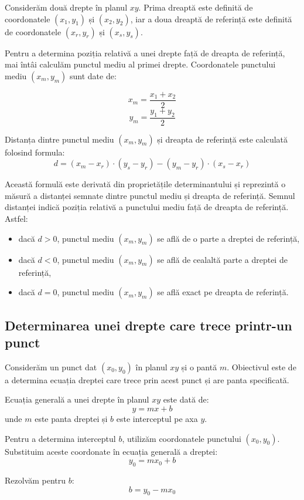 Considerăm două drepte în planul $xy$. Prima dreaptă este definită de coordonatele $(x_1, y_1)$ și $(x_2, y_2)$, iar a doua dreaptă de referință este definită de coordonatele $(x_r, y_r)$ și $(x_s, y_s)$.

Pentru a determina poziția relativă a unei drepte față de dreapta de referință, mai întâi calculăm punctul mediu al primei drepte. Coordonatele punctului mediu $(x_m, y_m)$ sunt date de:

\[
    x_m = \frac{x_1 + x_2}{2}
\]
\[
    y_m = \frac{y_1 + y_2}{2}
\]

Distanța dintre punctul mediu $(x_m, y_m)$ și dreapta de referință este calculată folosind formula:
\[
    d = (x_m - x_r) \cdot (y_s - y_r) - (y_m - y_r) \cdot (x_s - x_r)
\]

Această formulă este derivată din proprietățile determinantului și reprezintă o măsură a distanței semnate dintre punctul mediu și dreapta de referință. Semnul distanței indică poziția relativă a punctului mediu față de dreapta de referință. Astfel:
\begin{itemize}
    \item dacă $d > 0$, punctul mediu $(x_m, y_m)$ se află de o parte a dreptei de referință,
    \item  dacă $d < 0$, punctul mediu $(x_m, y_m)$ se află de cealaltă parte a dreptei de referință,
    \item  dacă $d = 0$, punctul mediu $(x_m, y_m)$ se află exact pe dreapta de referință.
\end{itemize}

\subsection*{Determinarea unei drepte care trece printr-un punct}

Considerăm un punct dat $(x_0, y_0)$ în planul $xy$ și o pantă $m$. Obiectivul este de a determina ecuația dreptei care trece prin acest punct și are panta specificată.

Ecuația generală a unei drepte în planul $xy$ este dată de:
\[
    y = mx + b
\]
unde $m$ este panta dreptei și $b$ este interceptul pe axa $y$.

Pentru a determina interceptul $b$, utilizăm coordonatele punctului $(x_0, y_0)$. Substituim aceste coordonate în ecuația generală a dreptei:
\[
    y_0 = mx_0 + b
\]

Rezolvăm pentru $b$:
\[
    b = y_0 - mx_0
\]

